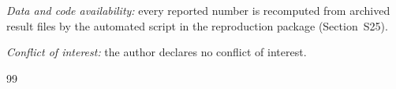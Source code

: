 \documentclass[journal]{IEEEtran}
\begin{document}
\noindent\textit{Data and code availability:} every reported number is recomputed from archived result files by the automated script in the reproduction package (Section~S25).

\noindent\textit{Conflict of interest:} the author declares no conflict of interest.

\FloatBarrier
\begin{thebibliography}{99}
\footnotesize
\setlength{\itemsep}{0pt}
\setlength{\parskip}{0pt}
\setlength{\baselineskip}{8.3pt}



\end{thebibliography}
\end{document}
